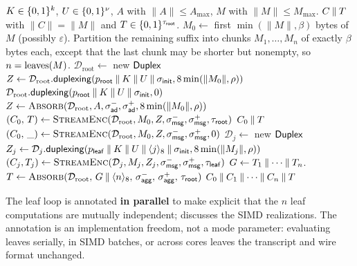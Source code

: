 \begin{algorithm}[t]
  \caption{$\Enc_K(U, A, M)$.}
  \label{alg:enc}
  \begin{algorithmic}[1]
    \Require $K \in \{0,1\}^k$, $U \in \{0,1\}^{\nu}$, $A$ with $\|A\| \leq A_{\max}$, $M$ with $\|M\| \leq M_{\max}$.
    \Ensure $C \mathbin{\|} T$ with $\|C\| = \|M\|$ and $T \in \{0,1\}^{\tau_{\mathsf{root}}}$.
    \State $M_0 \gets$ first $\min(\|M\|, \beta)$ bytes of $M$ (possibly $\varepsilon$).
    \State Partition the remaining suffix into chunks $M_1, \dots, M_n$ of exactly $\beta$ bytes each, except that the last chunk may be shorter but nonempty, so $n = \operatorname{leaves}(M)$.
    \State $\mathcal{D}_{\text{root}} \gets$ new $\mathsf{Duplex}$
      \State $Z \gets \mathcal{D}_{\text{root}}.\mathsf{duplexing}(p_{\mathsf{root}} \mathbin{\|} K \mathbin{\|} U \mathbin{\|} \sigma_{\mathsf{init}}, 8\min(\|M_0\|, \rho))$
    \Else
      \State $\mathcal{D}_{\text{root}}.\mathsf{duplexing}(p_{\mathsf{root}} \mathbin{\|} K \mathbin{\|} U \mathbin{\|} \sigma_{\mathsf{init}}, 0)$
      \State $Z \gets \Call{Absorb}{\mathcal{D}_{\text{root}}, A, \sigadmore, \sigadlast, 8\min(\|M_0\|, \rho)}$
    \EndIf
      \State $(C_0,\, T) \gets \Call{StreamEnc}{\mathcal{D}_{\text{root}}, M_0, Z, \sigmsgmore, \sigmsglast, \tauroot}$
      \State \Return $C_0 \mathbin{\|} T$
    \EndIf
    \State $(C_0,\, \_) \gets \Call{StreamEnc}{\mathcal{D}_{\text{root}}, M_0, Z, \sigmsgmore, \sigmsglast, 0}$
      \State $\mathcal{D}_j \gets$ new $\mathsf{Duplex}$
      \State $Z_j \gets \mathcal{D}_j.\mathsf{duplexing}(p_{\mathsf{leaf}} \mathbin{\|} K \mathbin{\|} U \mathbin{\|} \langle j \rangle_8 \mathbin{\|} \sigma_{\mathsf{init}}, 8\min(\|M_j\|, \rho))$
      \State $(C_j, T_j) \gets \Call{StreamEnc}{\mathcal{D}_j, M_j, Z_j, \sigmsgmore, \sigmsglast, \tauleaf}$
    \EndFor
    \State $G \gets T_1 \mathbin{\|} \cdots \mathbin{\|} T_n$.
    \State $T \gets \Call{Absorb}{\mathcal{D}_{\text{root}},\, G \concat \langle n \rangle_8,\, \sigaggmore,\, \sigagglast,\, \tauroot}$
    \State \Return $C_0 \mathbin{\|} C_1 \mathbin{\|} \cdots \mathbin{\|} C_n \mathbin{\|} T$
  \end{algorithmic}
\end{algorithm}

The leaf loop is annotated \textbf{in parallel} to make explicit that
the $n$ leaf computations are mutually independent; 
discusses the SIMD realizations. The annotation is an implementation
freedom, not a mode parameter: evaluating leaves serially, in SIMD
batches, or across cores leaves the transcript and wire format unchanged.

